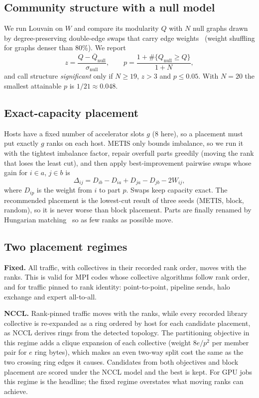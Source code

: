 \documentclass[conference]{IEEEtran}
\begin{document}
\subsection{Community structure with a null model}
We run Louvain on $W$ and compare its modularity $Q$ with $N$ null graphs drawn by
degree-preserving double-edge swaps that carry edge weights~\cite{maslov2002specificity} (weight
shuffling for graphs denser than 80\%). We report
\begin{equation}
z = \frac{Q-\overline{Q}_{\mathrm{null}}}{\sigma_{\mathrm{null}}},\qquad
p = \frac{1+\#\{Q_{\mathrm{null}}\geq Q\}}{1+N},
\end{equation}
and call structure \emph{significant} only if $N\geq 19$, $z>3$ and $p\leq 0.05$. With $N=20$ the
smallest attainable $p$ is $1/21\approx0.048$.

\subsection{Exact-capacity placement}
Hosts have a fixed number of accelerator slots $g$ (8 here), so a placement must put exactly $g$
ranks on each host. METIS only bounds imbalance, so we run it with the tightest imbalance factor,
repair overfull parts greedily (moving the rank that loses the least cut), and then apply
best-improvement pairwise swaps whose gain for $i\in a$, $j\in b$ is
\begin{equation}
\Delta_{ij} = D_{ib}-D_{ia}+D_{ja}-D_{jb}-2W_{ij},
\end{equation}
where $D_{ip}$ is the weight from $i$ to part $p$. Swaps keep capacity exact. The recommended
placement is the lowest-cut result of three seeds (METIS, block, random), so it is never worse than
block placement. Parts are finally renamed by Hungarian matching~\cite{kuhn1955hungarian} so as few
ranks as possible move.

\subsection{Two placement regimes}
\textbf{Fixed.} All traffic, with collectives in their recorded rank order, moves with the
ranks. This is valid for MPI codes whose collective algorithms follow rank order, and for traffic
pinned to rank identity: point-to-point, pipeline sends, halo exchange and expert all-to-all.

\textbf{NCCL.} Rank-pinned traffic moves with the ranks, while every recorded library collective
is re-expanded as a ring ordered by host for each candidate placement, as NCCL derives rings from
the detected topology. The partitioning objective in this regime adds a clique expansion of each
collective (weight $8e/p^2$ per member pair for $e$ ring bytes), which makes an even two-way split
cost the same as the two crossing ring edges it causes. Candidates from both objectives and block
placement are scored under the NCCL model and the best is kept. For GPU jobs this regime is the
headline; the fixed regime overstates what moving ranks can achieve.
\end{document}
